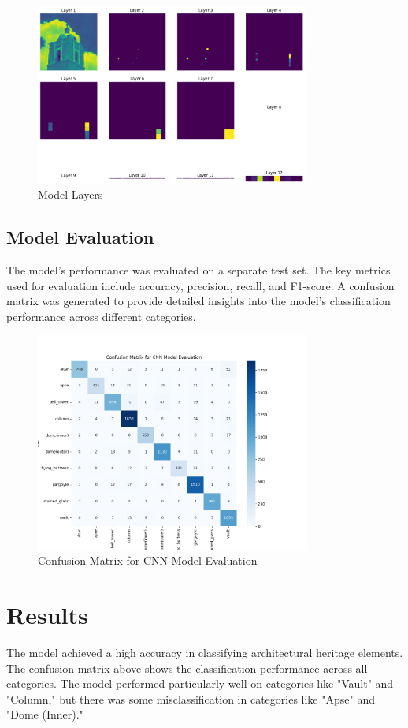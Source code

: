 \documentclass[12pt]{article}
\begin{document}
\begin{figure}[H]
    \centering
    \includegraphics[width=0.8\textwidth]{output.png}
    \caption{Model Layers}
\end{figure}


\subsection{Model Evaluation}
The model's performance was evaluated on a separate test set. The key metrics used for evaluation include accuracy, precision, recall, and F1-score. A confusion matrix was generated to provide detailed insights into the model's classification performance across different categories.

\begin{figure}[H]
    \centering
    \includegraphics[width=0.8\textwidth]{confusion_matrix.png}
    \caption{Confusion Matrix for CNN Model Evaluation}
\end{figure}

\section{Results}
The model achieved a high accuracy in classifying architectural heritage elements. The confusion matrix above shows the classification performance across all categories. The model performed particularly well on categories like "Vault" and "Column," but there was some misclassification in categories like "Apse" and "Dome (Inner)."
\end{document}
